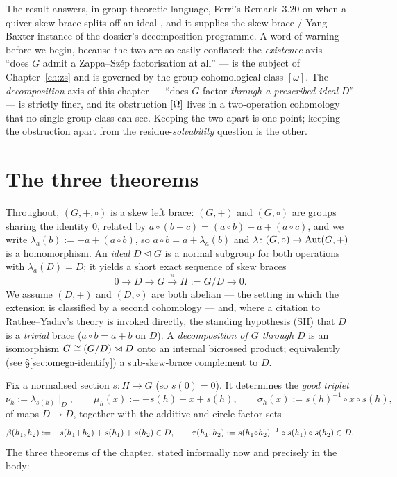 The result answers, in group-theoretic language, Ferri's Remark~3.20 on when a
quiver skew brace splits off an ideal \cite{ferri-qsb}, and it supplies the
skew-brace / Yang--Baxter instance of the dossier's decomposition programme. A
word of warning before we begin, because the two are so easily conflated: the
\emph{existence} axis --- ``does $G$ admit a Zappa--Sz\'ep factorisation at all''
--- is the subject of Chapter~\ref{ch:zs} and is governed by the group-cohomological
class $[\omega]$. The \emph{decomposition} axis of this chapter --- ``does $G$
factor \emph{through a prescribed ideal} $D$'' --- is strictly finer, and its
obstruction $[\Omega]$ lives in a two-operation cohomology that no single group class
can see. Keeping the two apart is one point; keeping the obstruction apart from the
residue-\emph{solvability} question is the other.

\section{The three theorems}\label{sec:omega-intro}

Throughout, $(G,+,\circ)$ is a skew left brace: $(G,+)$ and $(G,\circ)$ are
groups sharing the identity $0$, related by
$a\circ(b+c)=(a\circ b)-a+(a\circ c)$, and we write
$\lambda_a(b):=-a+(a\circ b)$, so $a\circ b=a+\lambda_a(b)$ and
$\lambda\colon(G,\circ)\to\mathrm{Aut}(G,+)$ is a homomorphism. An \emph{ideal}
$D\trianglelefteq G$ is a normal subgroup for both operations with
$\lambda_a(D)=D$; it yields a short exact sequence of skew braces
\[
   0 \longrightarrow D \longrightarrow G
     \xrightarrow{\ \pi\ } H:=G/D \longrightarrow 0 .
\]
We assume $(D,+)$ and $(D,\circ)$ are both abelian --- the setting in which the
extension is classified by a second cohomology --- and, where a citation to
Rathee--Yadav's theory is invoked directly, the standing hypothesis (SH) that $D$
is a \emph{trivial} brace ($a\circ b=a+b$ on $D$). A \emph{decomposition of $G$
through $D$} is an isomorphism $G\cong (G/D)\bowtie D$ onto an internal bicrossed
product; equivalently (see \S\ref{sec:omega-identify}) a sub-skew-brace complement
to $D$.

Fix a normalised section $s\colon H\to G$ (so $s(0)=0$). It determines the
\emph{good triplet}
\[
  \nu_h := \lambda_{s(h)}\!\mid_D,\qquad
  \mu_h(x) := -s(h)+x+s(h),\qquad
  \sigma_h(x) := s(h)^{-1}\circ x\circ s(h),
\]
of maps $D\to D$, together with the additive and circle factor sets
\[
  \beta(h_1,h_2) := -s(h_1{+}h_2)+s(h_1)+s(h_2)\in D,\qquad
  \bar\tau(h_1,h_2) := s(h_1{\circ}h_2)^{-1}\circ s(h_1)\circ s(h_2)\in D.
\]
The three theorems of the chapter, stated informally now and precisely in the body:


